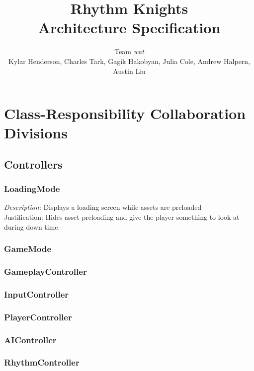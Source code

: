 \documentclass[]{article}
\renewcommand{\em}{\emph}
\begin{document}
\title{\textbf{Rhythm Knights} \\ Architecture Specification}
\author{Team \emph{wat} \\
  \small{Kylar Henderson, Charles Tark, 
    Gagik Hakobyan, Julia Cole, Andrew Halpern, Austin Liu}}
\date{} %
\maketitle

\section*{Class-Responsibility Collaboration Divisions}

\subsection*{Controllers}
\subsubsection*{LoadingMode}
\em{Description:} Displays a loading screen while assets are preloaded \\
Justification: Hides asset preloading and give the player something 
to look at during down time.\\

\subsubsection*{GameMode}
\subsubsection*{GameplayController}
\subsubsection*{InputController}
\subsubsection*{PlayerController}
\subsubsection*{AIController}
\subsubsection*{RhythmController}
\end{document}
